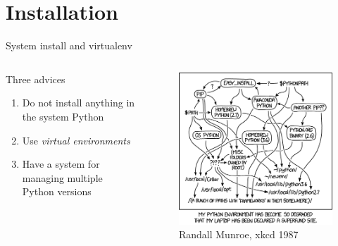 \section{Installation}

\begin{frame}{System install and virtualenv}
  \begin{columns}
    \begin{column}{0.6\linewidth}
      Three advices
      \begin{enumerate}
        \item Do not install anything in the system Python
        \item Use \emph{virtual environments}
        \item Have a system for managing multiple Python versions
      \end{enumerate}

    \end{column}
    \begin{column}{0.4\linewidth}
      \begin{figure}
        \includegraphics[width=\linewidth,keepaspectratio]{fig/python_environment}
        \caption{Randall Munroe, xkcd 1987}
      \end{figure}
    \end{column}
  \end{columns}
\end{frame}

